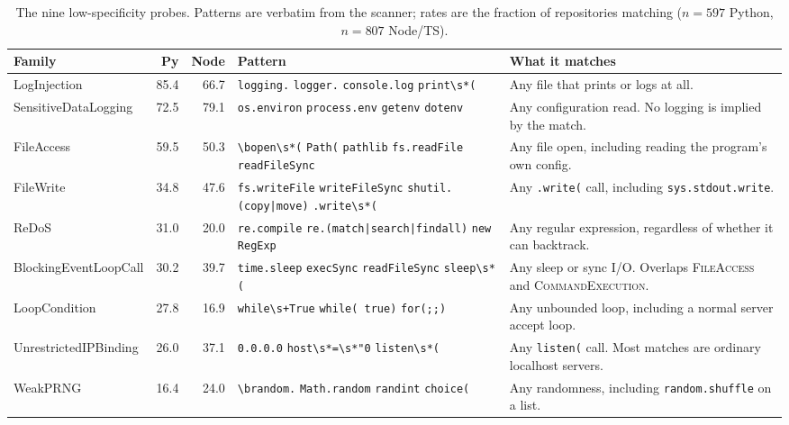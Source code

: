 \begin{table}[t]
\centering
\caption{The nine low-specificity probes. Patterns are verbatim from the
  scanner; rates are the fraction of repositories matching
  ($n=597$ Python, $n=807$ Node/TS).}
\label{tab:probe-validity}
\footnotesize
\setlength{\tabcolsep}{4pt}
\begin{tabular}{@{}lrrp{2.6cm}p{2.9cm}@{}}
\toprule
\textbf{Family} & \textbf{Py} & \textbf{Node} & \textbf{Pattern} & \textbf{What it matches} \\
\midrule
LogInjection & 85.4 & 66.7 &
  \texttt{logging.} \texttt{logger.} \texttt{console.log} \texttt{print\textbackslash s*(} &
  Any file that prints or logs at all. \\
\addlinespace
SensitiveData\-Logging & 72.5 & 79.1 &
  \texttt{os.environ} \texttt{process.env} \texttt{getenv} \texttt{dotenv} &
  Any configuration read. No logging is implied by the match. \\
\addlinespace
FileAccess & 59.5 & 50.3 &
  \texttt{\textbackslash bopen\textbackslash s*(} \texttt{Path(} \texttt{pathlib} \texttt{fs.readFile} \texttt{readFileSync} &
  Any file open, including reading the program's own config. \\
\addlinespace
FileWrite & 34.8 & 47.6 &
  \texttt{fs.writeFile} \texttt{writeFileSync} \texttt{shutil.(copy|move)} \texttt{.write\textbackslash s*(} &
  Any \texttt{.write(} call, including \texttt{sys.stdout.write}. \\
\addlinespace
ReDoS & 31.0 & 20.0 &
  \texttt{re.compile} \texttt{re.(match|search|findall)} \texttt{new RegExp} &
  Any regular expression, regardless of whether it can backtrack. \\
\addlinespace
BlockingEvent\-LoopCall & 30.2 & 39.7 &
  \texttt{time.sleep} \texttt{execSync} \texttt{readFileSync} \texttt{sleep\textbackslash s*(} &
  Any sleep or sync I/O. Overlaps \textsc{FileAccess} and \textsc{CommandExecution}. \\
\addlinespace
LoopCondition & 27.8 & 16.9 &
  \texttt{while\textbackslash s+True} \texttt{while(\ true)} \texttt{for(;;)} &
  Any unbounded loop, including a normal server accept loop. \\
\addlinespace
Unrestricted\-IPBinding & 26.0 & 37.1 &
  \texttt{0.0.0.0} \texttt{host\textbackslash s*=\textbackslash s*"0} \texttt{listen\textbackslash s*(} &
  Any \texttt{listen(} call. Most matches are ordinary localhost servers. \\
\addlinespace
WeakPRNG & 16.4 & 24.0 &
  \texttt{\textbackslash brandom.} \texttt{Math.random} \texttt{randint} \texttt{choice(} &
  Any randomness, including \texttt{random.shuffle} on a list. \\
\bottomrule
\end{tabular}
\end{table}
